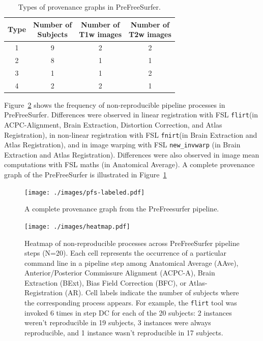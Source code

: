 \documentclass[a4paper,num-refs]{oup-contemporary}
\newcommand{\flirt}[0]{\texttt{flirt}\xspace}
\newcommand{\fnirt}[0]{\texttt{fnirt}\xspace}
\begin{document}
\begin{table}
\centering
\begin{threeparttable}
\caption{Types of provenance graphs in PreFreeSurfer.}
\label{table:data-clusters}

\begin{tabular}{cc|cc}
\toprule
Type   &   \makecell{Number of \\ Subjects}   &  \makecell{Number of \\ T1w images}          & \makecell{Number of \\ T2w images}   \\ \midrule
1      &               9                      &  2 & 2 \\
2      &               8                      &  1 & 1 \\
3      &               1                      &  1 & 2 \\
4      &               2                      &  2 & 1\\
\bottomrule
\end{tabular}
\end{threeparttable}
\end{table}


Figure~\ref{fig:pfs_freq} shows the frequency of non-reproducible pipeline processes
in PreFreeSurfer. 
Differences were observed in linear registration 
with FSL \flirt (in ACPC-Alignment, Brain Extraction, Distortion Correction, and
Atlas Registration), in non-linear registration with FSL \fnirt (in Brain Extraction 
and Atlas Registration), and in image warping with FSL \texttt{new\_invwarp} (in Brain Extraction 
and Atlas Registration). Differences were also observed in image mean 
computations with FSL maths  (in Anatomical Average). 
A complete provenance graph of the PreFreeSurfer is illustrated in Figure~\ref{fig:complete_pfs}
\begin{figure}
  \centering
    \texttt{[image: ./images/pfs-labeled.pdf]} 
    \caption{A complete provenance graph from the PreFreesurfer pipeline.}
    \label{fig:complete_pfs}
\end{figure}


\begin{figure}
\centering
  \texttt{[image: ./images/heatmap.pdf]}
  \caption{Heatmap of non-reproducible processes across PreFreeSurfer pipeline steps (N=20). 
  Each cell represents the occurrence of a particular command line in a
  pipeline step among Anatomical Average (AAve), Anterior/Posterior
  Commissure Alignment (ACPC-A), Brain Extraction (BExt), Bias Field
  Correction (BFC), or Atlas-Registration (AR). Cell labels indicate the
  number of subjects where the corresponding process appears. For example,
  the \flirt tool was invoked 6 times in step DC for each of the 20
  subjects: 2 instances weren't reproducible in 19 subjects, 3
  instances were always reproducible, and 1 instance wasn't reproducible in
  17 subjects.
        }
  \label{fig:pfs_freq}
\end{figure}
\end{document}
